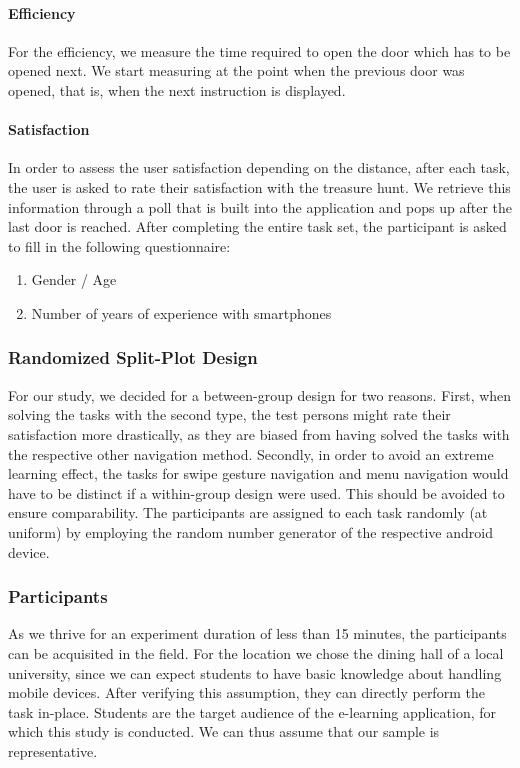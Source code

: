 \documentclass{sig-alternate-05-2015}
\begin{document}
\paragraph{Efficiency} For the efficiency, we measure the time required to open the door which has to be opened next. We start measuring at the point
when the previous door was opened, that is, when the next instruction is displayed.
\paragraph{Satisfaction}
In order to assess the user satisfaction depending on the distance, after each task, the user is asked to rate their
satisfaction with the treasure hunt. We retrieve this information through a poll that is built into the application and pops
up after the last door is reached.
After completing the entire task set, the participant is asked to fill in the following questionnaire:
\begin{enumerate}
  \item Gender / Age
  \item Number of years of experience with smartphones
\end{enumerate}

\subsubsection{Randomized Split-Plot Design}
For our study, we decided for a between-group design for two reasons.
First, when solving the tasks with the second type, the test persons might rate their satisfaction more drastically, as they
are biased from having solved the tasks with the respective other navigation method.
Secondly, in order to avoid an extreme learning effect, the tasks for swipe gesture navigation and menu navigation
would have to be distinct if a within-group design were used. This should be avoided to ensure comparability.
The participants are assigned to each task randomly (at uniform) by
employing the random number generator of the respective android device.

\subsubsection{Participants}
As we thrive for an experiment duration of less than 15 minutes,
the participants can be acquisited in the field.
For the location we chose the dining hall of a local university,
since we can expect students to have basic knowledge about handling mobile devices.
After verifying this assumption, they can directly perform the task in-place.
Students are the target audience of the e-learning application,
for which this study is conducted.
We can thus assume that our sample is representative.
\end{document}
